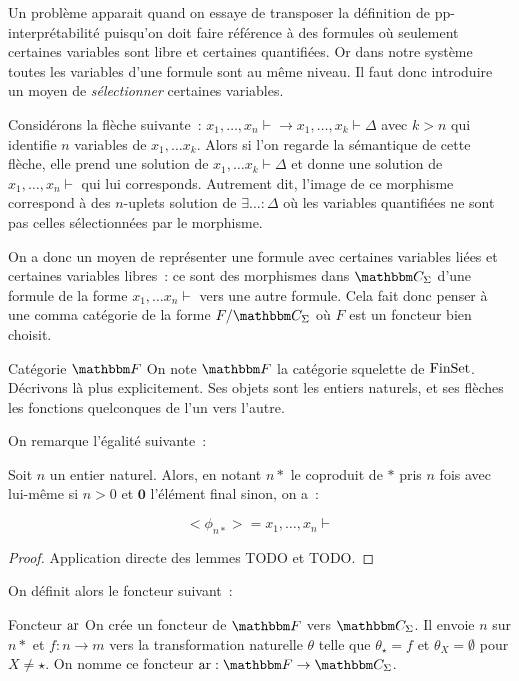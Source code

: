 Un problème apparait quand on essaye de transposer la définition de pp-interprétabilité
puisqu'on doit faire référence à des formules où seulement certaines variables sont
libre et certaines quantifiées. Or dans notre système toutes les variables d'une
formule sont au même niveau. Il faut donc introduire un moyen de \emph{sélectionner}
certaines variables.

Considérons la flèche suivante~:
$x_1,\dots, x_n\vdash \rightarrow x_1,\dots, x_k\vdash\Delta$ avec $k>n$ qui identifie
$n$ variables de $x_1,\dots x_k$. Alors si l'on regarde la sémantique de cette flèche,
elle prend une solution de $x_1,\dots x_k\vdash\Delta$ et donne une solution de
$x_1,\dots, x_n\vdash$ qui lui corresponds. Autrement dit, l'image de ce morphisme
correspond à des $n$-uplets solution de $\exists \dots:\Delta$ où les variables
quantifiées ne sont pas celles sélectionnées par le morphisme.

On a donc un moyen de représenter une formule avec certaines variables liées et certaines
variables libres~: ce sont des morphismes dans $\C_\Sigma$ d'une formule de la forme
$x_1,\dots x_n\vdash$ vers une autre formule. Cela fait donc penser à une comma
catégorie de la forme $F/\C_\Sigma$ où $F$ est un foncteur bien choisit.

\begin{defi}{Catégorie $\cf$}
    On note $\cf$ la catégorie squelette de $\text{FinSet}$. Décrivons là plus explicitement.
    Ses objets sont les entiers naturels, et ses flèches les fonctions quelconques
    de l'un vers l'autre.
\end{defi}

On remarque l'égalité suivante~:

\begin{lem}
    Soit $n$ un entier naturel. Alors, en notant $n\ast$ le coproduit de $\ast$ pris
    $n$ fois avec lui-même si $n>0$ et $\mathbf{0}$ l'élément final sinon, on
    a~:

    \[ <\phi_{n\ast}> = x_1,\dots, x_n\vdash \]
\end{lem}

\begin{proof}
    Application directe des lemmes TODO et TODO.
\end{proof}

On définit alors le foncteur suivant~:

\begin{defi}{Foncteur $\text{ar}$}
    On crée un foncteur de $\cf$ vers $\C_\Sigma$. Il envoie $n$ sur $n\ast$ et
    $f : n\rightarrow m$ vers la transformation naturelle $\theta$ telle que
    $\theta_\star = f$ et $\theta_X = \emptyset$ pour $X\neq\star$. On nomme ce
    foncteur $\arf : \cf\rightarrow\C_\Sigma$.
\end{defi}

